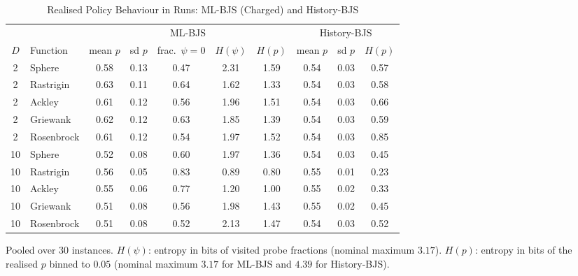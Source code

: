 \documentclass[conference]{IEEEtran}
\begin{document}
\begin{table}[t]
\centering
\caption{Realised Policy Behaviour in Runs: ML-BJS (Charged) and History-BJS}
\label{tab:real}
\scriptsize
\setlength{\tabcolsep}{3.5pt}
\begin{tabular}{@{}clcccccccc@{}}
\toprule
 & & \multicolumn{5}{c}{ML-BJS} & \multicolumn{3}{c}{History-BJS}\\
\cmidrule(lr){3-7}\cmidrule(lr){8-10}
$D$ & Function & mean $p$ & sd $p$ & frac.\ $\psi{=}0$ & $H(\psi)$ & $H(p)$ & mean $p$ & sd $p$ & $H(p)$\\
\midrule
2 & Sphere & 0.58 & 0.13 & 0.47 & 2.31 & 1.59 & 0.54 & 0.03 & 0.57 \\
2 & Rastrigin & 0.63 & 0.11 & 0.64 & 1.62 & 1.33 & 0.54 & 0.03 & 0.58 \\
2 & Ackley & 0.61 & 0.12 & 0.56 & 1.96 & 1.51 & 0.54 & 0.03 & 0.66 \\
2 & Griewank & 0.62 & 0.12 & 0.63 & 1.85 & 1.39 & 0.54 & 0.03 & 0.59 \\
2 & Rosenbrock & 0.61 & 0.12 & 0.54 & 1.97 & 1.52 & 0.54 & 0.03 & 0.85 \\
\midrule
10 & Sphere & 0.52 & 0.08 & 0.60 & 1.97 & 1.36 & 0.54 & 0.03 & 0.45 \\
10 & Rastrigin & 0.56 & 0.05 & 0.83 & 0.89 & 0.80 & 0.55 & 0.01 & 0.23 \\
10 & Ackley & 0.55 & 0.06 & 0.77 & 1.20 & 1.00 & 0.55 & 0.02 & 0.33 \\
10 & Griewank & 0.51 & 0.08 & 0.56 & 1.98 & 1.43 & 0.55 & 0.02 & 0.45 \\
10 & Rosenbrock & 0.51 & 0.08 & 0.52 & 2.13 & 1.47 & 0.54 & 0.03 & 0.52 \\
\bottomrule
\end{tabular}

\smallskip
\footnotesize Pooled over 30 instances. $H(\psi)$: entropy in bits of visited probe fractions (nominal maximum $3.17$). $H(p)$: entropy in bits of the realised $p$ binned to $0.05$ (nominal maximum $3.17$ for ML-BJS and $4.39$ for History-BJS).
\end{table}
\end{document}
